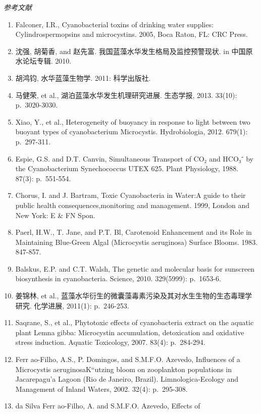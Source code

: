 \documentclass[]{book}
\begin{document}
\emph{参考文献}

\begin{enumerate}
\def\labelenumi{\arabic{enumi}.}
\item
  Falconer, I.R., Cyanobacterial toxins of drinking water supplies:
  Cylindrospermopsins and microcystins. 2005, Boca Raton, FL: CRC Press.
\item
  沈强, 胡菊香, and 赵先富. 我国蓝藻水华发生格局及监控预警现状. in
  中国原水论坛专辑. 2010.
\item
  胡鸿钧, 水华蓝藻生物学. 2011: 科学出版社.
\item
  马健荣, et al., 湖泊蓝藻水华发生机理研究进展. 生态学报, 2013. 33(10):
  p.~3020-3030.
\item
  Xiao, Y., et al., Heterogeneity of buoyancy in response to light
  between two buoyant types of cyanobacterium Microcystis.
  Hydrobiologia, 2012. 679(1): p.~297-311.
\item
  Espie, G.S. and D.T. Canvin, Simultaneous Transport of CO₂ and HCO₃⁻
  by the Cyanobacterium Synechococcus UTEX 625. Plant Physiology, 1988.
  87(3): p.~551-554.
\item
  Chorus, I. and J. Bartram, Toxic Cyanobacteria in Water:A guide to
  their public health consequences,monitoring and management. 1999,
  London and New York: E \& FN Spon.
\item
  Paerl, H.W., T. Jane, and P.T. Bl, Carotenoid Enhancement and its Role
  in Maintaining Blue-Green Algal (Microcystis aeruginosa) Surface
  Blooms. 1983. 847-857.
\item
  Balskus, E.P. and C.T. Walsh, The genetic and molecular basis for
  sunscreen biosynthesis in cyanobacteria. Science, 2010. 329(5999):
  p.~1653-6.
\item
  姜锦林, et al.,
  蓝藻水华衍生的微囊藻毒素污染及其对水生生物的生态毒理学研究. 化学进展,
  2011(1): p.~246-253.
\item
  Saqrane, S., et al., Phytotoxic effects of cyanobacteria extract on
  the aquatic plant Lemna gibba: Microcystin accumulation, detoxication
  and oxidative stress induction. Aquatic Toxicology, 2007. 83(4):
  p.~284-294.
\item
  Ferr ao-Filho, A.S., P. Domingos, and S.M.F.O. Azevedo, Influences of
  a Microcystis aeruginosaK``utzing bloom on zooplankton populations in
  Jacarepagu'a Lagoon (Rio de Janeiro, Brazil). Limnologica-Ecology and
  Management of Inland Waters, 2002. 32(4): p.~295-308.
\item
  da Silva Ferr ao-Filho, A. and S.M.F.O. Azevedo, Effects of

\end{enumerate}
\end{document}
